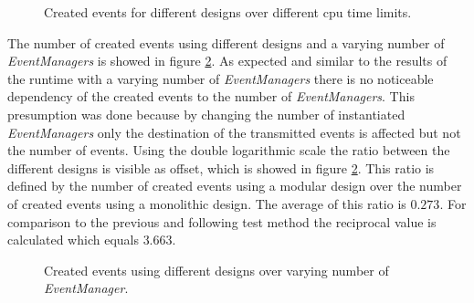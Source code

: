 \begin{figure}
    \centering
    \caption{Created events for different designs over different cpu time limits.}
    \label{fig:results_event_cpu_time}
\end{figure}

The number of created events using different designs and a varying number of \emph{EventManagers} is showed in figure \ref{fig:results_event_eventmanager}.
As expected and similar to the results of the runtime with a varying number of \emph{EventManagers} there is no noticeable dependency of the created events to the number of \emph{EventManagers}.
This presumption was done because by changing the number of instantiated \emph{EventManagers} only the destination of the transmitted events is affected but not the number of events.
Using the double logarithmic scale the ratio between the different designs is visible as offset, which is showed in figure \ref{fig:results_event_eventmanager}.
This ratio is defined by the number of created events using a modular design over the number of created events using a monolithic design.
The average of this ratio is $0.273$.
For comparison to the previous and following test method the reciprocal value is calculated which equals $3.663$.
\\

\begin{figure}
    \centering
    \caption{Created events using different designs over varying number of \emph{EventManager}.}
    \label{fig:results_event_eventmanager}
\end{figure}

